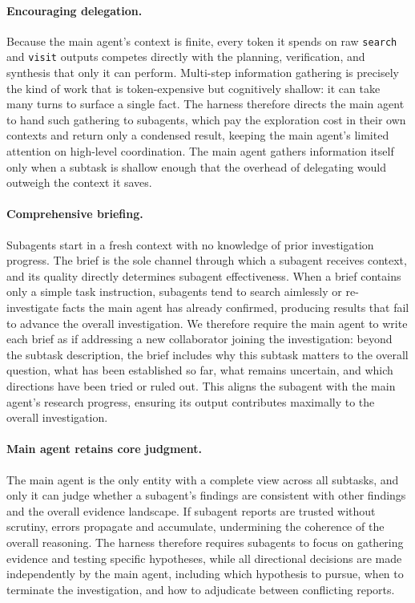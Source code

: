 \documentclass[table]{gtech}
\begin{document}
\paragraph{Encouraging delegation.}
Because the main agent's context is finite, every token it spends on raw \texttt{search} and \texttt{visit} outputs competes directly with the planning, verification, and synthesis that only it can perform. Multi-step information gathering is precisely the kind of work that is token-expensive but cognitively shallow: it can take many turns to surface a single fact. The harness therefore directs the main agent to hand such gathering to subagents, which pay the exploration cost in their own contexts and return only a condensed result, keeping the main agent's limited attention on high-level coordination. The main agent gathers information itself only when a subtask is shallow enough that the overhead of delegating would outweigh the context it saves.

\paragraph{Comprehensive briefing.}
Subagents start in a fresh context with no knowledge of prior investigation progress. The brief is the sole channel through which a subagent receives context, and its quality directly determines subagent effectiveness. When a brief contains only a simple task instruction, subagents tend to search aimlessly or re-investigate facts the main agent has already confirmed, producing results that fail to advance the overall investigation. We therefore require the main agent to write each brief as if addressing a new collaborator joining the investigation: beyond the subtask description, the brief includes why this subtask matters to the overall question, what has been established so far, what remains uncertain, and which directions have been tried or ruled out. This aligns the subagent with the main agent's research progress, ensuring its output contributes maximally to the overall investigation.

\paragraph{Main agent retains core judgment.}
The main agent is the only entity with a complete view across all subtasks, and only it can judge whether a subagent's findings are consistent with other findings and the overall evidence landscape. If subagent reports are trusted without scrutiny, errors propagate and accumulate, undermining the coherence of the overall reasoning. The harness therefore requires subagents to focus on gathering evidence and testing specific hypotheses, while all directional decisions are made independently by the main agent, including which hypothesis to pursue, when to terminate the investigation, and how to adjudicate between conflicting reports.
\end{document}
